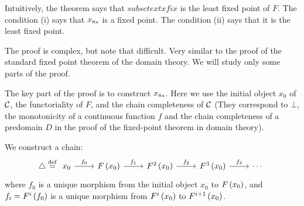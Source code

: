 \begin{enumcirc}
	\item
	Intuitively, the theorem says that $subsctext{x}{fix}$ is the least fixed point
	of $F$.
	The condition (i) says that $x_{\textrm{\tiny fix}}$ is a fixed point.
	The condition (ii) says that it is the least fixed point.
	\item
	The proof is complex, but note that difficult.
	Very similar to the proof of the standard fixed point theorem of the domain
	theory.
	We will study only some parts of the proof.
	\item
	The key part of the proof is to construct $x_{\textrm{\tiny fix}}$.
	Here we use the initial object $x_0$ of $\mathcal{C}$, the functoriality of $F$, and
	the chain completeness of $\mathcal{C}$
	(They correspond to $\bot$, the monotonicity of a continuous function $f$ and the chain completeness of a predomain $D$
	in the proof of the fixed-point theorem in domain theory).

	We construct a chain:
	\[
		\triangle \defeq
		\begin{tikzcd}[row sep=large]
			x_0 \arrow[r, "f_0"] & F\prths{x_0} \arrow[r, "f_1"] & F^2\prths{x_0} \arrow[r, "f_2"] & F^3\prths{x_0} \arrow[r, "f_3"] & \cdots
		\end{tikzcd}
	\]
	where $f_0$ is a unique morphism from the initial object $x_0$ to
	$F\left( x_0 \right)$,
	and $f_i = F^i\left( f_0 \right)$ is a unique morphism from $F^i\left( x_0 \right)$ to
	$F^{i+1}\left( x_0 \right)$.


\end{enumcirc}
